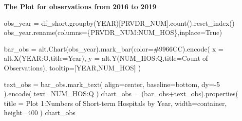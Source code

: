 \documentclass[
  letterpaper,
  DIV=11,
  numbers=noendperiod]{scrartcl}
\newenvironment{Shaded}{\begin{snugshade}}{\end{snugshade}}
\newcommand{\DecValTok}[1]{\textcolor[rgb]{0.68,0.00,0.00}{#1}}
\newcommand{\NormalTok}[1]{\textcolor[rgb]{0.00,0.23,0.31}{#1}}
\newcommand{\OperatorTok}[1]{\textcolor[rgb]{0.37,0.37,0.37}{#1}}
\newcommand{\StringTok}[1]{\textcolor[rgb]{0.13,0.47,0.30}{#1}}
\newcommand{\VariableTok}[1]{\textcolor[rgb]{0.07,0.07,0.07}{#1}}
\begin{document}
\textbf{The Plot for observations from 2016 to 2019}

\begin{Shaded}
\begin{Highlighting}[]
\NormalTok{obs\_year }\OperatorTok{=}\NormalTok{ df\_short.groupby(}\StringTok{\textquotesingle{}YEAR\textquotesingle{}}\NormalTok{)[}\StringTok{\textquotesingle{}PRVDR\_NUM\textquotesingle{}}\NormalTok{].count().reset\_index()}
\NormalTok{obs\_year.rename(columns}\OperatorTok{=}\NormalTok{\{}\StringTok{\textquotesingle{}PRVDR\_NUM\textquotesingle{}}\NormalTok{:}\StringTok{\textquotesingle{}NUM\_HOS\textquotesingle{}}\NormalTok{\},inplace}\OperatorTok{=}\VariableTok{True}\NormalTok{)}

\NormalTok{bar\_obs }\OperatorTok{=}\NormalTok{ alt.Chart(obs\_year).mark\_bar(color}\OperatorTok{=}\StringTok{\textquotesingle{}\#9966CC\textquotesingle{}}\NormalTok{).encode(}
\NormalTok{  x }\OperatorTok{=}\NormalTok{ alt.X(}\StringTok{\textquotesingle{}YEAR:O\textquotesingle{}}\NormalTok{,title}\OperatorTok{=}\StringTok{\textquotesingle{}Year\textquotesingle{}}\NormalTok{),}
\NormalTok{  y }\OperatorTok{=}\NormalTok{ alt.Y(}\StringTok{\textquotesingle{}NUM\_HOS:Q\textquotesingle{}}\NormalTok{,title}\OperatorTok{=}\StringTok{\textquotesingle{}Count of Observations\textquotesingle{}}\NormalTok{),}
\NormalTok{  tooltip}\OperatorTok{=}\NormalTok{[}\StringTok{\textquotesingle{}YEAR\textquotesingle{}}\NormalTok{,}\StringTok{\textquotesingle{}NUM\_HOS\textquotesingle{}}\NormalTok{]}
\NormalTok{)}

\NormalTok{text\_obs }\OperatorTok{=}\NormalTok{ bar\_obs.mark\_text(}
\NormalTok{    align}\OperatorTok{=}\StringTok{\textquotesingle{}center\textquotesingle{}}\NormalTok{,}
\NormalTok{    baseline}\OperatorTok{=}\StringTok{\textquotesingle{}bottom\textquotesingle{}}\NormalTok{,}
\NormalTok{    dy}\OperatorTok{={-}}\DecValTok{5}
\NormalTok{).encode(}
\NormalTok{    text}\OperatorTok{=}\StringTok{\textquotesingle{}NUM\_HOS:Q\textquotesingle{}}
\NormalTok{)}
\NormalTok{chart\_obs }\OperatorTok{=}\NormalTok{ (bar\_obs}\OperatorTok{+}\NormalTok{text\_obs).properties(}
\NormalTok{  title }\OperatorTok{=} \StringTok{\textquotesingle{}Plot 1:Numbers of Short{-}term Hospitals by Year\textquotesingle{}}\NormalTok{,}
\NormalTok{  width}\OperatorTok{=}\StringTok{\textquotesingle{}container\textquotesingle{}}\NormalTok{,}
\NormalTok{  height}\OperatorTok{=}\DecValTok{400}
\NormalTok{)}
\NormalTok{chart\_obs}
\end{Highlighting}
\end{Shaded}
\end{document}
